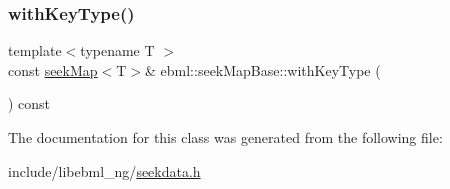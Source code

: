 \mbox{\label{classebml_1_1seekMapBase_a174a7a2a9e40d0465b1c065e9549b5b4}} 
\subsubsection{\texorpdfstring{with\+Key\+Type()}{withKeyType()}\hspace{0.1cm}{\footnotesize\ttfamily [2/2]}}
{\footnotesize\ttfamily template$<$typename T $>$ \\
const \mbox{\hyperlink{classebml_1_1seekMap}{seek\+Map}}$<$T$>$\& ebml\+::seek\+Map\+Base\+::with\+Key\+Type (\begin{DoxyParamCaption}{ }\end{DoxyParamCaption}) const}



The documentation for this class was generated from the following file\+:\begin{DoxyCompactItemize}
\item 
include/libebml\+\_\+ng/\mbox{\hyperlink{seekdata_8h}{seekdata.\+h}}\end{DoxyCompactItemize}
